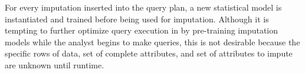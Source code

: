 For every imputation inserted into the query plan, a new statistical model is instantiated and trained before being used for imputation.
Although it is tempting to further optimize query execution in \ProjectName{} by pre-training imputation models while the analyst begins to make queries,
this is not desirable because the specific rows of data, set of complete attributes, and set of attributes to impute are unknown until runtime.


